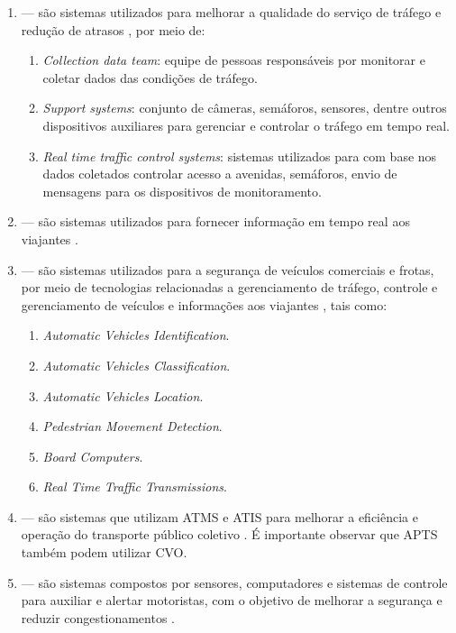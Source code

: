 \documentclass[
	12pt,				%
	oneside,			%
	a4paper,			%
	english,			%
	brazil				%
	]{abntex2ppgsi}
\begin{document}
\begin{enumerate}
\item {} --- são sistemas utilizados para melhorar a qualidade do serviço de tráfego e redução de atrasos \cite{figueiredo2001towards}, por meio de:
\begin{enumerate}
\item \textit{Collection data team}: equipe de pessoas responsáveis por monitorar e coletar dados das condições de tráfego.
\item \textit{Support systems}: conjunto de câmeras, semáforos, sensores, dentre outros dispositivos auxiliares para gerenciar e controlar o tráfego em tempo real.
\item \textit{Real time traffic control systems}: sistemas utilizados para com base nos dados coletados controlar acesso a avenidas, semáforos, envio de mensagens para os dispositivos de monitoramento.
\end{enumerate}
\item {} --- são sistemas utilizados para fornecer informação em tempo real aos viajantes \cite{figueiredo2001towards}.
\item {} --- são sistemas utilizados para a segurança de veículos comerciais e frotas, por meio de tecnologias relacionadas a gerenciamento de tráfego, controle e gerenciamento de veículos e informações aos viajantes \cite{figueiredo2001towards}, tais como:
\begin{enumerate}
\item \textit{Automatic Vehicles Identification}.
\item \textit{Automatic Vehicles Classification}.
\item \textit{Automatic Vehicles Location}.
\item \textit{Pedestrian Movement Detection}.
\item \textit{Board Computers}.
\item \textit{Real Time Traffic Transmissions}.
\end{enumerate}
\item {} --- são sistemas que utilizam ATMS e ATIS para melhorar a eficiência e operação do transporte público coletivo \cite{figueiredo2001towards}. É importante observar que APTS também podem utilizar CVO.
\item {} --- são sistemas compostos por sensores, computadores e sistemas de controle para auxiliar e alertar motoristas, com o objetivo de melhorar a segurança e reduzir congestionamentos \cite{figueiredo2001towards}.
\end{enumerate}
\end{document}
